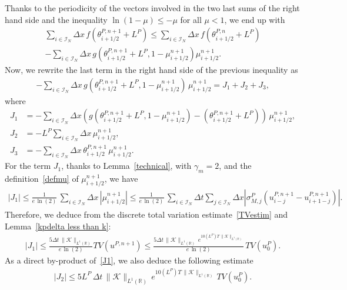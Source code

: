 \documentclass[11pt]{amsart}
\newcommand{\K}{\mathcal{K}}
\newcommand{\R}{\mathbb{R}}
\newcommand{\I}{\mathcal{I}_N}
\begin{document}
Thanks to the periodicity of the vectors involved in the two last sums of the right hand side and the inequality $\ln(1-\mu)\leq -\mu$ for all $\mu < 1$, we end up with
\begin{multline}\label{aux1}
\sum_{i\in\I} \Delta x\, f\left(\theta_{i +1/2}^{P, n+1} + L^P\right) 
\leq  \sum_{i \in\I} \Delta x \, f\left(\theta_{i + 1/2}^{P, n} + L^P\right) \\ - \sum_{i\in\I} \Delta x \, g\left(\theta_{i +1/2}^{P,n+1} + L^P, 1-\mu^{n+1}_{i+1/2}\right)  \mu_{i +1/2}^{n+1}.
\end{multline}
Now, we rewrite the last term in the right hand side of the previous inequality as
\begin{align*}
-\sum_{i\in\I} \Delta x \, g\left(\theta_{i +1/2}^{P,n+1} + L^P, 1-\mu^{n+1}_{i+1/2}\right) \, \mu_{i +1/2}^{n+1}  = J_1+J_2+J_3,
\end{align*}
where
\begin{align*}
J_1 &= -\sum_{i\in\I} \Delta x \left( g\left(\theta_{i +1/2}^{P,n+1} + L^P, 1-\mu^{n+1}_{i+1/2}\right) - \left(\theta^{P,n+1}_{i+1/2} + L^P \right)\right) \, \mu_{i +1/2}^{n+1} ,\\
J_2 &= -L^P \sum_{i \in \I} \Delta x \, \mu^{n+1}_{i+1/2},\\
J_3 &= -\sum_{i \in \I} \Delta x \, \theta^{P,n+1}_{i+1/2} \,  \mu^{n+1}_{i+1/2}.
\end{align*}
For the term $J_1$, thanks to Lemma~\ref{technical}, with $\gamma_m=2$, and the definition~\eqref{defmu} of $\mu^{n+1}_{i+1/2}$, we have
\begin{align*}
    |J_1| \leq \frac{1}{e \, \ln(2)} \, \sum_{i \in \I} \Delta x \, \left|\mu^{n+1}_{i+1/2}\right| \leq \frac{1}{e \, \ln(2)} \, \sum_{i \in \I} \Delta t \sum_{j \in \I} \Delta x \left| \sigma^P_{M,j} \left( u^{P,n+1}_{i-j} - u^{P,n+1}_{i+1-j}\right)\right|.
\end{align*}
Therefore, we deduce from the discrete total variation estimate~\eqref{TVestim} and Lemma~\ref{kpdelta less than k}:
\begin{align}\label{J1}
    |J_1| \leq \frac{5 \Delta t \, \|\K\|_{L^1(\R)}}{e \,\ln(2)} TV(u^{P,n+1}) \leq  \frac{5 \Delta t \, \|\K\|_{L^1(\R)} \, e^{10(L^P)T \, \|\K\|_{L^1(\R)}}}{e \, \ln(2)} \, TV(u^P_0).
\end{align}
As a direct by-product of~\eqref{J1}, we also deduce the following estimate
\begin{align}\label{J2}
    |J_2| \leq  5 L^P \, \Delta t \, \|\K\|_{L^1(\R)} \, e^{10(L^P)T \, \|\K\|_{L^1(\R)}} \, TV(u^P_0).
\end{align}
\end{document}
